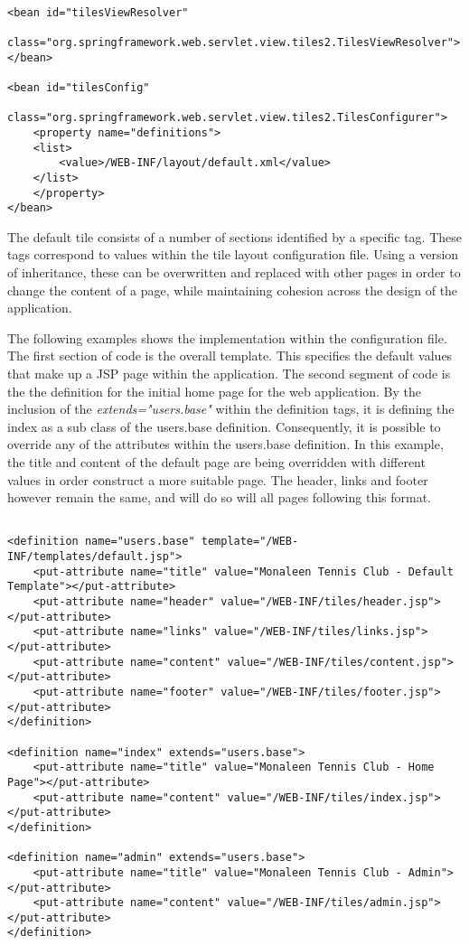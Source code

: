 \begin{lstlisting}

<bean id="tilesViewResolver"
	class="org.springframework.web.servlet.view.tiles2.TilesViewResolver">
</bean>

<bean id="tilesConfig"
	class="org.springframework.web.servlet.view.tiles2.TilesConfigurer">
	<property name="definitions">
	<list>
		<value>/WEB-INF/layout/default.xml</value>
	</list>
	</property>
</bean>
\end{lstlisting}

The default tile consists of a number of sections identified by a specific tag. These tags correspond to values within the tile layout configuration file. Using a version of inheritance, these can be overwritten and replaced with other pages in order to change the content of a page, while maintaining cohesion across the design of the application. 

The following examples shows the implementation within the configuration file. The first section of code is the overall template. This specifies the default values that make up a JSP page within the application. The second segment of code is the the definition for the initial home page for the web application. By the inclusion of the \textit{extends="users.base"} within the definition tags, it is defining the index as a sub class of the users.base definition. Consequently, it is possible to override any of the attributes within the users.base definition. In this example, the title and content of the default page are being overridden with different values in order construct a more suitable page. The header, links and footer however remain the same, and will do so will all pages following this format.

\begin{lstlisting}

<definition name="users.base" template="/WEB-INF/templates/default.jsp">
	<put-attribute name="title" value="Monaleen Tennis Club - Default Template"></put-attribute>
	<put-attribute name="header" value="/WEB-INF/tiles/header.jsp"></put-attribute>
	<put-attribute name="links" value="/WEB-INF/tiles/links.jsp"></put-attribute>
	<put-attribute name="content" value="/WEB-INF/tiles/content.jsp"></put-attribute>
	<put-attribute name="footer" value="/WEB-INF/tiles/footer.jsp"></put-attribute>
</definition>

<definition name="index" extends="users.base">
	<put-attribute name="title" value="Monaleen Tennis Club - Home Page"></put-attribute>
	<put-attribute name="content" value="/WEB-INF/tiles/index.jsp"></put-attribute>
</definition>

<definition name="admin" extends="users.base">
	<put-attribute name="title" value="Monaleen Tennis Club - Admin"></put-attribute>
	<put-attribute name="content" value="/WEB-INF/tiles/admin.jsp"></put-attribute>
</definition>

\end{lstlisting}

